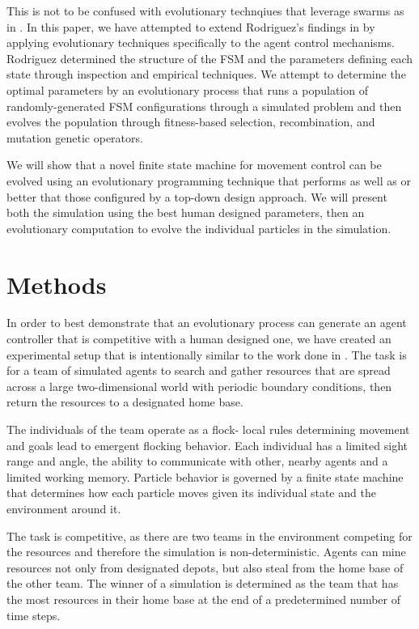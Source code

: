 \documentclass[12pt,journal,compsoc]{IEEEtran}
\begin{document}
This is not to be confused with evolutionary technqiues that leverage swarms as in \cite{wei2002swarm,miranda2005evolutionary}. In this paper, we have attempted to extend Rodriguez's findings in \cite{rodriguez2004extending} by applying evolutionary techniques specifically to the agent control mechanisms. Rodriguez determined the structure of the FSM and the parameters defining each state through inspection and empirical techniques. We attempt to determine the optimal parameters by an evolutionary process that runs a population of randomly-generated FSM configurations through a simulated problem and then evolves the population through fitness-based selection, recombination, and mutation genetic operators.

We will show that a novel finite state machine for movement control can be evolved using an evolutionary programming technique that performs as well as or better that those configured by a top-down design approach. We will present both the simulation using the best human designed parameters, then an evolutionary computation to evolve the individual particles in the simulation.

\section{Methods}

In order to best demonstrate that an evolutionary process can generate an agent controller that is competitive with a human designed one, we have created an experimental setup that is intentionally similar to the work done in \cite{rodriguez2004extending}. The task is for a team of simulated agents to search and gather resources that are spread across a large two-dimensional world with periodic boundary conditions, then return the resources to a designated home base.

The individuals of the team operate as a flock- local rules determining movement and goals lead to emergent flocking behavior. Each individual has a limited sight range and angle, the ability to communicate with other, nearby agents and a limited working memory. Particle behavior is governed by a finite state machine that determines how each particle moves given its individual state and the environment around it.

The task is competitive, as there are two teams in the environment competing for the resources and therefore the simulation is non-deterministic. Agents can mine resources not only from designated depots, but also steal from the home base of the other team. The winner of a simulation is determined as the team that has the most resources in their home base at the end of a predetermined number of time steps.
\end{document}
